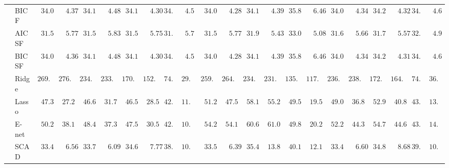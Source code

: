 \begin{tabular}{ll|ll|llllll|llllll|llllll}
 & BIC F  & $\phantom{0}34.02$ & $\phantom{00}4.37$ & $\phantom{0}34.12$ & $\phantom{00}4.48$ & $\phantom{0}34.14$ & $\phantom{00}4.30$ & $34.37$ & $\phantom{0}4.51$ & $\phantom{0}34.07$ & $\phantom{00}4.28$ & $\phantom{0}34.15$ & $\phantom{00}4.39$ & $\phantom{0}35.82$ & $\phantom{00}6.46$ & $\phantom{0}34.05$ & $\phantom{00}4.34$ & $\phantom{0}34.24$ & $\phantom{00}4.32$ & $34.79$ & $\phantom{0}4.62$ \\
 & AIC SF  & $\phantom{0}31.51$ & $\phantom{00}5.77$ & $\phantom{0}31.53$ & $\phantom{00}5.83$ & $\phantom{0}31.56$ & $\phantom{00}5.75$ & $31.61$ & $\phantom{0}5.72$ & $\phantom{0}31.55$ & $\phantom{00}5.77$ & $\phantom{0}31.90$ & $\phantom{00}5.43$ & $\phantom{0}33.01$ & $\phantom{00}5.08$ & $\phantom{0}31.64$ & $\phantom{00}5.66$ & $\phantom{0}31.77$ & $\phantom{00}5.57$ & $32.85$ & $\phantom{0}4.91$ \\
 & BIC SF  & $\phantom{0}34.03$ & $\phantom{00}4.36$ & $\phantom{0}34.12$ & $\phantom{00}4.48$ & $\phantom{0}34.14$ & $\phantom{00}4.30$ & $34.37$ & $\phantom{0}4.51$ & $\phantom{0}34.07$ & $\phantom{00}4.28$ & $\phantom{0}34.15$ & $\phantom{00}4.39$ & $\phantom{0}35.83$ & $\phantom{00}6.46$ & $\phantom{0}34.05$ & $\phantom{00}4.34$ & $\phantom{0}34.25$ & $\phantom{00}4.31$ & $34.79$ & $\phantom{0}4.62$ \\
 & Ridge  & $269.44$ & $276.63$ & $234.70$ & $233.99$ & $170.94$ & $152.09$ & $74.95$ & $29.61$ & $259.86$ & $264.07$ & $234.15$ & $231.49$ & $135.20$ & $117.41$ & $236.35$ & $238.97$ & $172.96$ & $164.54$ & $74.94$ & $36.67$ \\
 & Lasso  & $\phantom{0}47.33$ & $\phantom{0}27.24$ & $\phantom{0}46.60$ & $\phantom{0}31.77$ & $\phantom{0}46.53$ & $\phantom{0}28.52$ & $42.51$ & $11.27$ & $\phantom{0}51.29$ & $\phantom{0}47.56$ & $\phantom{0}58.19$ & $\phantom{0}55.20$ & $\phantom{0}49.53$ & $\phantom{0}19.51$ & $\phantom{0}49.00$ & $\phantom{0}36.86$ & $\phantom{0}52.96$ & $\phantom{0}40.85$ & $43.80$ & $13.81$ \\
 & E-net  & $\phantom{0}50.24$ & $\phantom{0}38.13$ & $\phantom{0}48.44$ & $\phantom{0}37.33$ & $\phantom{0}47.58$ & $\phantom{0}30.58$ & $42.45$ & $10.90$ & $\phantom{0}54.22$ & $\phantom{0}54.16$ & $\phantom{0}60.64$ & $\phantom{0}61.06$ & $\phantom{0}49.82$ & $\phantom{0}20.28$ & $\phantom{0}52.28$ & $\phantom{0}44.36$ & $\phantom{0}54.71$ & $\phantom{0}44.63$ & $43.98$ & $14.06$ \\
 & SCAD  & $\phantom{0}33.40$ & $\phantom{00}6.56$ & $\phantom{0}33.70$ & $\phantom{00}6.09$ & $\phantom{0}34.69$ & $\phantom{00}7.77$ & $38.66$ & $10.23$ & $\phantom{0}33.50$ & $\phantom{00}6.39$ & $\phantom{0}35.48$ & $\phantom{0}13.81$ & $\phantom{0}40.10$ & $\phantom{0}12.19$ & $\phantom{0}33.49$ & $\phantom{00}6.60$ & $\phantom{0}34.81$ & $\phantom{00}8.68$ & $39.06$ & $10.90$ \\

\end{tabular}
